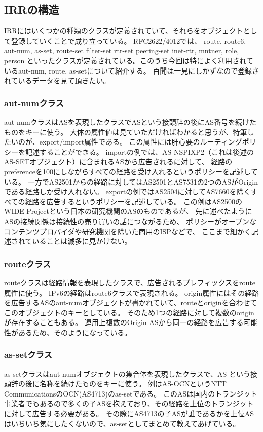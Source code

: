\subsection{IRRの構造}

IRRにはいくつかの種類のクラスが定義されていて、それらをオブジェクトとして登録していくことで成り立っている。
RFC2622/4012では、
route, route6, aut-num, as-set, route-set filter-set rtr-set peering-set inet-rtr, mntner, role, person
といったクラスが定義されている。このうち今回は特によく利用されているaut-num, route, as-setについて紹介する。
百聞は一見にしかずなので登録されているデータを見て頂きたい。

\subsubsection{aut-numクラス}
aut-numクラスはASを表現したクラスでASという接頭辞の後にAS番号を続けたものをキーに使う。
大体の属性値は見ていただければわかると思うが、特筆したいのが、export/import属性である。
この属性には肝心要のルーティングポリシーを記述することができる。
importの例では、AS-NSPIXP2（これは後述のAS-SETオブジェクト）に含まれるASから広告されるに対して、
経路のpreferenceを100にしながらすべての経路を受け入れるというポリシーを記述している。
一方でAS2501からの経路に対してはAS2501とAS7531の2つのASがOriginである経路しか受け入れない。
exportの例ではAS2504に対してAS7660を除くすべての経路を広告するというポリシーを記述している。
この例はAS2500のWIDE Projectという日本の研究機関のASのものであるが、
先に述べたようにASの接続関係は接続性の売り買いの話につながるため、
ポリシーがオープンなコンテンツプロバイダや研究機関を除いた商用のISPなどで、
ここまで細かく記述されていることは滅多に見かけない。


\subsubsection{routeクラス}
routeクラスは経路情報を表現したクラスで、広告されるプレフィックスをroute属性に使う。
IPv6の経路はroute6クラスで表現される。
origin属性にはその経路を広告するASのaut-numオブジェクトが書かれていて、routeとoriginを合わせてこのオブジェクトのキーとしている。
そのため1つの経路に対して複数のoriginが存在することもある。
運用上複数のOrigin ASから同一の経路を広告する可能性があるため、そのようになっている。

\subsubsection{as-setクラス}
as-setクラスはaut-numオブジェクトの集合体を表現したクラスで、AS-という接頭辞の後に名称を続けたものをキーに使う。
例はAS-OCNというNTT CommunicationsのOCN(AS4713)のas-setである。
このASは国内のトランジット事業者でもあるので多くの子ASを抱えており、その経路を上位のトランジットに対して広告する必要がある。
その際にAS4713の子ASが誰であるかを上位ASはいちいち気にしたくないので、as-setとしてまとめて教えてあげている。

